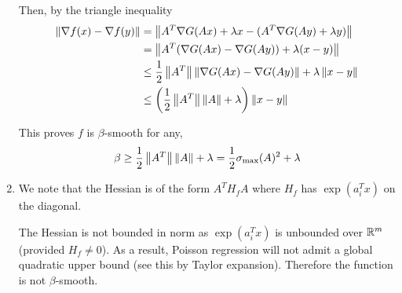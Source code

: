 \documentclass[10pt]{article}
\begin{document}
\begin{solution}[Solution]
\begin{enumerate}[label=(\alph*)]
        Then, by the triangle inequality
        \begin{align*}
            \left\lVert\nabla f(x) - \nabla f(y)\right\rVert
            &= \left\lVert A^T \nabla G(Ax) + \lambda x - (A^T \nabla G(Ay) + \lambda y)\right\rVert
            \\&= \left\lVert A^T (\nabla G(Ax) - \nabla G(Ay)) + \lambda(x-y)\right\rVert 
            \\&\leq \frac{1}{2}\left\lVert A^T\right\rVert \left\lVert\nabla G(Ax) - \nabla G(Ay)\right\rVert + \lambda\left\lVert x-y\right\rVert
            \\&\leq \left(\frac{1}{2}\left\lVert A^T\right\rVert\left\lVert A\right\rVert + \lambda\right) \left\lVert x-y\right\rVert
        \end{align*}

        This proves \( f \) is \( \beta \)-smooth for any,
        \begin{align*}
            \beta \geq \frac{1}{2}\left\lVert A^T\right\rVert\left\lVert A\right\rVert + \lambda
            = \frac{1}{2}\sigma_{\text{max}}(A)^2 + \lambda
        \end{align*}
        


    \item 
        

        We note that the Hessian is of the form \( A^TH_fA \) where \( H_f \) has \( \exp(a_i^Tx) \) on the diagonal. 
        
        The Hessian is not bounded in norm as \( \exp(a_i^Tx) \) is unbounded over \( \mathbb{R}^m \) (provided \( H_f\neq 0 \)). As a result, Poisson regression will not admit a global quadratic upper bound (see this by Taylor expansion). Therefore the function is not \( \beta \)-smooth.

\end{enumerate}


\end{solution}
\end{document}
